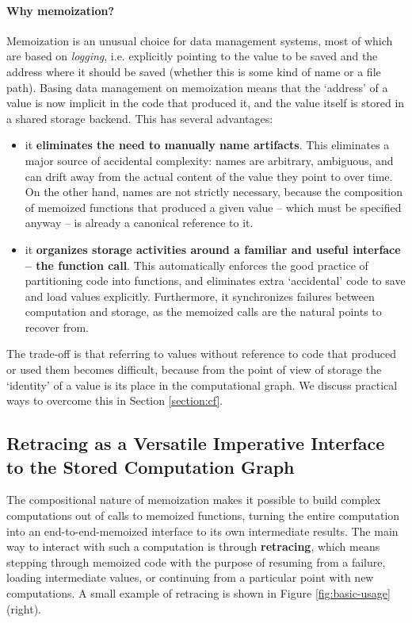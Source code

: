 \documentclass{article} %
\begin{document}
\paragraph{Why memoization?} Memoization is an unusual choice for data
management systems, most of which are based on \emph{logging}, i.e. explicitly
pointing to the value to be saved and the address where it should be saved
(whether this is some kind of name or a file path). Basing data management on
memoization means that the `address' of a value is now implicit in the code that
produced it, and the value itself is stored in a shared storage backend. This has several advantages:
\begin{itemize}
\item it \textbf{eliminates the need to manually name artifacts}. This
eliminates a major source of accidental complexity: names are arbitrary,
ambiguous, and can drift away from the actual content of the value they point to
over time. On the other hand, names are not strictly necessary, because the
composition of memoized functions that produced a given value -- which must be specified anyway -- is already a canonical reference to it. 
\item it \textbf{organizes storage activities around a familiar and useful
interface -- the function call}. This automatically enforces the good practice
of partitioning code into functions, and eliminates extra `accidental' code to
save and load values explicitly. Furthermore, it synchronizes failures between
computation and storage, as the memoized calls are the natural points to
recover from.
\end{itemize}

The trade-off is that referring to values without reference to code that
produced or used them becomes difficult, because from the point of view of
storage the `identity' of a value is its place in the computational graph. We
discuss practical ways to overcome this in Section \ref{section:cf}.

\subsection{Retracing as a Versatile Imperative Interface to the Stored Computation Graph}
\label{subsection:}

The compositional nature of memoization makes it possible to build complex
computations out of calls to memoized functions, turning the entire computation
into an end-to-end-memoized interface to its own intermediate results. The main
way to interact with such a computation is through \textbf{retracing}, which
means stepping through memoized code with the purpose of resuming from a
failure, loading intermediate values, or continuing from a particular point with
new computations. A small example of retracing is shown in Figure
\ref{fig:basic-usage} (right). 
\end{document}
